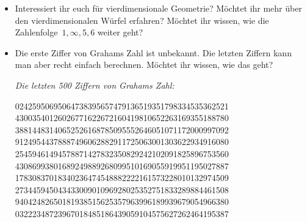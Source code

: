\documentclass{../../zirkelblatt1718}
\theoremstyle{definition}
\theoremstyle{plain}
\theoremstyle{remark}
\begin{document}
\begin{itemize}
  \item Interessiert ihr euch für vierdimensionale Geometrie? Möchtet ihr mehr
  über den vierdimensionalen Würfel erfahren? Möchtet ihr wissen, wie die
  Zahlenfolge~$1, \infty, 5, 6$ weiter geht?
  \item Die erste Ziffer von Grahams Zahl ist unbekannt. Die letzten Ziffern
  kann man aber recht einfach berechnen. Möchtet ihr wissen, wie das geht?
\begin{center}
\emph{Die letzten 500 Ziffern von Grahams Zahl:}

02425950695064738395657479136519351798334535362521 \\
43003540126026771622672160419810652263169355188780 \\
38814483140652526168785095552646051071172000997092 \\
91249544378887496062882911725063001303622934916080 \\
25459461494578871427832350829242102091825896753560 \\
43086993801689249889268099510169055919951195027887 \\
17830837018340236474548882222161573228010132974509 \\
27344594504343300901096928025352751833289884461508 \\
94042482650181938515625357963996189939679054966380 \\
03222348723967018485186439059104575627262464195387
\par
\end{center}
\end{itemize}
\end{document}
